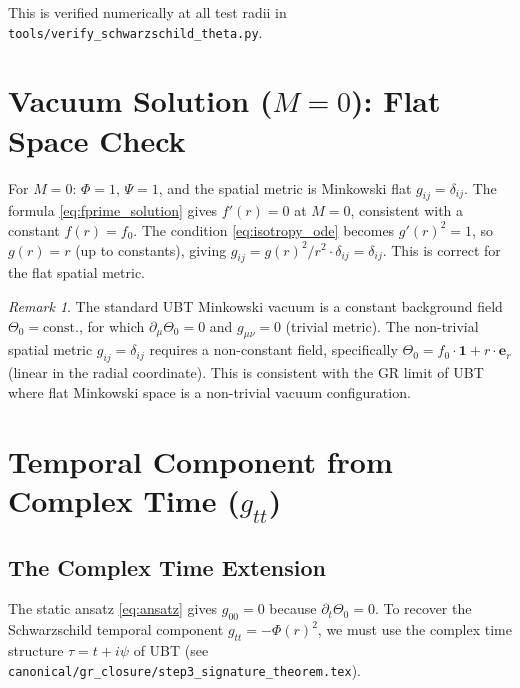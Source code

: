 \documentclass[11pt,a4paper]{article}
\theoremstyle{definition}
\theoremstyle{remark}
\newtheorem{remark}[theorem]{Remark}
\begin{document}
This is verified numerically at all test radii in
\texttt{tools/verify\_schwarzschild\_theta.py}.



\section{Vacuum Solution ($M = 0$): Flat Space Check}
\label{sec:flat}

For $M = 0$: $\Phi = 1$, $\Psi = 1$, and the spatial metric is Minkowski flat
$g_{ij} = \delta_{ij}$.  The formula \eqref{eq:fprime_solution} gives
$f'(r) = 0$ at $M = 0$, consistent with a constant $f(r) = f_0$.  The
condition \eqref{eq:isotropy_ode} becomes $g'(r)^2 = 1$, so $g(r) = r$ (up to
constants), giving $g_{ij} = g(r)^2/r^2 \cdot \delta_{ij} = \delta_{ij}$.
This is correct for the flat spatial metric.

\begin{remark}
The standard UBT Minkowski vacuum is a constant background field
$\Theta_0 = \mathrm{const.}$, for which $\partial_\mu\Theta_0 = 0$ and
$g_{\mu\nu} = 0$ (trivial metric).  The non-trivial spatial metric
$g_{ij} = \delta_{ij}$ requires a non-constant field, specifically
$\Theta_0 = f_0 \cdot \mathbf{1} + r \cdot \boldsymbol{e}_r$ (linear in the
radial coordinate).  This is consistent with the GR limit of UBT where
flat Minkowski space is a non-trivial vacuum configuration.
\end{remark}

\section{Temporal Component from Complex Time ($g_{tt}$)}
\label{sec:temporal}

\subsection{The Complex Time Extension}

The static ansatz \eqref{eq:ansatz} gives $g_{00} = 0$ because $\partial_t\Theta_0 = 0$.
To recover the Schwarzschild temporal component $g_{tt} = -\Phi(r)^2$, we must
use the complex time structure $\tau = t + i\psi$ of UBT
(see \texttt{canonical/gr\_closure/step3\_signature\_theorem.tex}).
\end{document}
